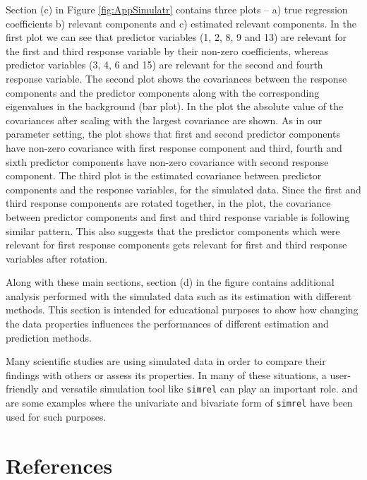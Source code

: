 \documentclass[review]{elsarticle}
\theoremstyle{definition}
\theoremstyle{definition}
\theoremstyle{remark}
\begin{document}
Section (c) in Figure \ref{fig:AppSimulatr} contains three plots -- a)
true regression coefficients b) relevant components and c) estimated
relevant components. In the first plot we can see that predictor
variables (1, 2, 8, 9 and 13) are relevant for the first and third
response variable by their non-zero coefficients, whereas predictor
variables (3, 4, 6 and 15) are relevant for the second and fourth
response variable. The second plot shows the covariances between the
response components and the predictor components along with the
corresponding eigenvalues in the background (bar plot). In the plot the
absolute value of the covariances after scaling with the largest
covariance are shown. As in our parameter setting, the plot shows that
first and second predictor components have non-zero covariance with
first response component and third, fourth and sixth predictor
components have non-zero covariance with second response component. The
third plot is the estimated covariance between predictor components and
the response variables, for the simulated data. Since the first and
third response components are rotated together, in the plot, the
covariance between predictor components and first and third response
variable is following similar pattern. This also suggests that the
predictor components which were relevant for first response components
gets relevant for first and third response variables after rotation.

Along with these main sections, section (d) in the figure contains
additional analysis performed with the simulated data such as its
estimation with different methods. This section is intended for
educational purposes to show how changing the data properties influences
the performances of different estimation and prediction methods.

Many scientific studies
\citep{helland2012near, saebo2008lpls, cook2015simultaneous} are using
simulated data in order to compare their findings with others or assess
its properties. In many of these situations, a user-friendly and
versatile simulation tool like \texttt{simrel} can play an important
role. \citet{gangsei2016theoretical} and \citet{saebo2015simrel} are
some examples where the univariate and bivariate form of \texttt{simrel}
have been used for such purposes.

\section{References}\label{references}


\renewcommand\refname{References}

\end{document}
